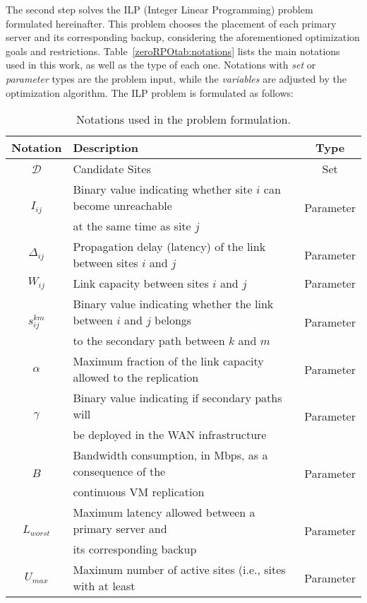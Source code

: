 \documentclass[preprint]{elsarticle}
\begin{document}
The second step solves the ILP (Integer Linear Programming) problem formulated hereinafter. This problem chooses the placement of each primary server and its corresponding backup, considering the aforementioned optimization goals and restrictions. Table~\ref{zeroRPOtab:notations} lists the main notations used in this work, as well as the type of each one. Notations with \textit{set} or \textit{parameter} types are the problem input, while the \textit{variables} are adjusted by the optimization algorithm. The ILP problem is formulated as follows:
\begin{table}
\caption{Notations used in the problem formulation.}
\centering
\scriptsize
\begin{center}
\begin{tabular}{|c||l||c|}
\hline \textbf{Notation} &\textbf{Description} &\textbf{Type}\\
\hline $\mathcal{D}$ &Candidate Sites &Set\\
\hline \multirow{2}{*}{$I_{ij}$} &Binary value indicating whether site $i$ can become unreachable &\multirow{2}{*}{Parameter}\\
&at the same time as site $j$  &\\
\hline $\Delta_{ij}$ &Propagation delay (latency) of the link between sites $i$ and $j$ &Parameter\\
\hline $W_{ij}$ &Link capacity between sites $i$ and $j$ &Parameter\\
\hline \multirow{2}{*}{$s^{km}_{ij}$} &Binary value indicating whether the link between $i$ and $j$ belongs &\multirow{2}{*}{Parameter}\\
&to the secondary path between $k$ and $m$ &\\
\hline $\alpha$ &Maximum fraction of the link capacity allowed to the replication &Parameter\\
\hline \multirow{2}{*}{$\gamma$} &Binary value indicating if secondary paths will &\multirow{2}{*}{Parameter}\\
&be deployed in the WAN infrastructure&\\
\hline \multirow{2}{*}{$B$} &Bandwidth consumption, in Mbps, as a consequence of the  &\multirow{2}{*}{Parameter}\\
&continuous VM replication &\\
\hline \multirow{2}{*}{$L_{worst}$} &Maximum latency allowed between a primary server and  &\multirow{2}{*}{Parameter}\\
&its corresponding backup &\\
\hline \multirow{2}{*}{$U_{max}$} &Maximum number of active sites (i.e., sites with at least   &\multirow{2}{*}{Parameter}\\

\end{tabular}
\end{center}
\end{table}
\end{document}
